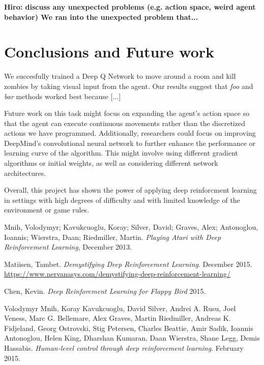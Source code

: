\documentclass{article}
\begin{document}
\begin{multicols}{2}
\bf Hiro: discuss any unexpected problems (e.g. action space, weird agent behavior) \rm
We ran into the unexpected problem that...





\section{Conclusions and Future work}
We succesfully trained a Deep Q Network to move around a room and kill zombies by taking visual input from the agent.
Our results suggest that \emph{foo} and \emph{bar} methods worked best because [...]

Future work on this task might focus on expanding the agent's action space so that the agent can execute continuous movements rather than the discretized actions we have programmed.
Additionally, researchers could focus on improving DeepMind's convolutional neural network to further enhance the performance or learning curve of the algorithm.
This might involve using different gradient algorithms or initial weights, as well as considering different network architectures.

Overall, this project has shown the power of applying deep reinforcment learning in settings with high degrees of difficulty and with limited knowledge of the environment or game rules.

\end{multicols}



\pagebreak
\begin{thebibliography}{9}

Mnih, Volodymyr; Kavukcuoglu, Koray; Silver, David; Graves, Alex; Antonoglou, Ioannis; Wierstra, Daan; Riedmiller, Martin.
\emph{Playing Atari with Deep Reinforcement Learning},
December 2013.

Matiisen, Tambet.
\emph{Demystifying Deep Reinforcement Learning}. December 2015.
\url{https://www.nervanasys.com/demystifying-deep-reinforcement-learning/}

Chen, Kevin.
\emph{Deep Reinforcment Learning for Flappy Bird}
2015.

Volodymyr Mnih,	Koray Kavukcuoglu,	David Silver, Andrei A. Rusu, Joel Veness, Marc G. Bellemare, Alex Graves,	Martin Riedmiller, Andreas K. Fidjeland, Georg Ostrovski, Stig Petersen, Charles Beattie, Amir Sadik, Ioannis Antonoglou,	Helen King,	Dharshan Kumaran, Daan Wierstra, Shane Legg, Demis Hassabis.
\emph{Human-level control through deep reinforcement learning}.
February 2015.

\end{thebibliography}
\end{document}
